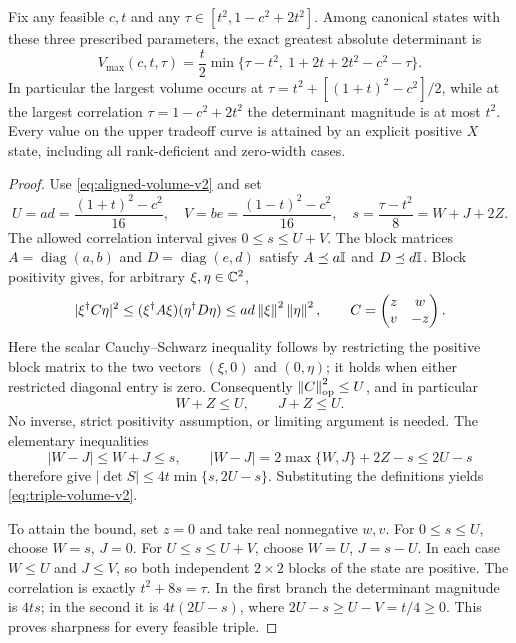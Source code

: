 \begin{theorem}\label{thm:triple-volume-v2}
Fix any feasible $c,t$ and any
$\tau\in[t^2,1-c^2+2t^2]$. Among canonical states with these three prescribed
parameters, the exact greatest absolute determinant is
\begin{equation}\label{eq:triple-volume-v2}
 \boxed{\quad
 V_{\max}(c,t,\tau)=\frac t2\min\bigl\{
 \tau-t^2,\ 1+2t+2t^2-c^2-\tau\bigr\}.
 \quad}
\end{equation}
In particular the largest volume occurs at
$\tau=t^2+[(1+t)^2-c^2]/2$, while at the largest correlation
$\tau=1-c^2+2t^2$ the determinant magnitude is at most $t^2$.
Every value on the upper tradeoff curve is attained by an explicit positive
$X$ state, including all rank-deficient and zero-width cases.
\end{theorem}

\begin{proof}
Use \eqref{eq:aligned-volume-v2} and set
\[
 U=ad=\frac{(1+t)^2-c^2}{16},\quad
 V=be=\frac{(1-t)^2-c^2}{16},\quad
 s=\frac{\tau-t^2}{8}=W+J+2Z.
\]
The allowed correlation interval gives $0\leq s\leq U+V$.
The block matrices $A=\operatorname{diag}(a,b)$ and
$D=\operatorname{diag}(e,d)$ satisfy
$A\preceq a\mathbb I$ and $D\preceq d\mathbb I$.
Block positivity gives, for arbitrary $\xi,\eta\in\mathbb C^2$,
\[
 |\xi^\dagger C\eta|^2\leq(\xi^\dagger A\xi)(\eta^\dagger D\eta)
                    \leq ad\left\lVert\xi\right\rVert^2\left\lVert\eta\right\rVert^2,
 \qquad C=\begin{pmatrix}z&w\\v&-z\end{pmatrix}.
\]
Here the scalar Cauchy--Schwarz inequality follows by restricting the
positive block matrix to the two vectors $(\xi,0)$ and $(0,\eta)$; it holds when
either restricted diagonal entry is zero. Consequently
$\left\lVert C\right\rVert_{\mathrm{op}}^2\leq U$, and in particular
\[
 W+Z\leq U,\qquad J+Z\leq U.
\]
No inverse, strict positivity assumption, or limiting argument is needed.
The elementary inequalities
\[
 |W-J|\leq W+J\leq s,
 \qquad
 |W-J|=2\max\{W,J\}+2Z-s\leq2U-s
\]
therefore give $|\det S|\leq4t\min\{s,2U-s\}$.
Substituting the definitions yields \eqref{eq:triple-volume-v2}.

To attain the bound, set $z=0$ and take real nonnegative $w,v$. For
$0\leq s\leq U$, choose $W=s$, $J=0$. For $U\leq s\leq U+V$, choose
$W=U$, $J=s-U$. In each case $W\leq U$ and $J\leq V$, so both independent
$2\times2$ blocks of the state are positive. The correlation is exactly
$t^2+8s=\tau$. In the first branch the determinant magnitude is $4ts$;
in the second it is $4t(2U-s)$, where $2U-s\geq U-V=t/4\geq0$.
This proves sharpness for every feasible triple.
\end{proof}



